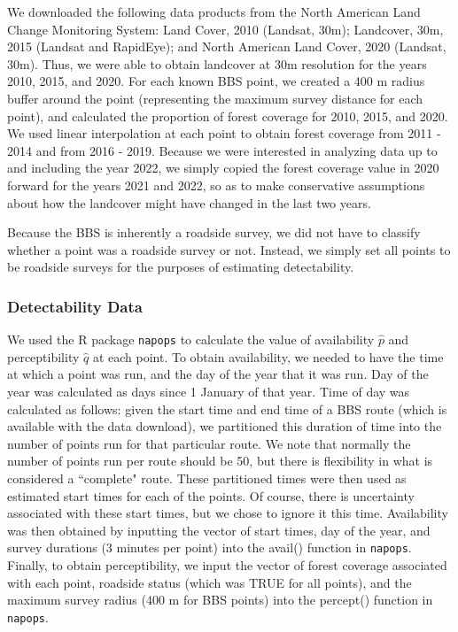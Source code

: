 \par We downloaded the following data products from the North American Land Change Monitoring System: Land Cover, 2010 (Landsat, 30m); Landcover, 30m, 2015 (Landsat and RapidEye); and North American Land Cover, 2020 (Landsat, 30m).
Thus, we were able to obtain landcover at 30m resolution for the years 2010, 2015, and 2020. 
For each known BBS point, we created a 400 m radius buffer around the point (representing the maximum survey distance for each point), and calculated the proportion of forest coverage for 2010, 2015, and 2020. 
We used linear interpolation at each point to obtain forest coverage from 2011 - 2014 and from 2016 - 2019. 
Because we were interested in analyzing data up to and including the year 2022, we simply copied the forest coverage value in 2020 forward for the years 2021 and 2022, so as to make conservative assumptions about how the landcover might have changed in the last two years.

\par Because the BBS is inherently a roadside survey, we did not have to classify whether a point was a roadside survey or not.
Instead, we simply set all points to be roadside surveys for the purposes of estimating detectability.

\subsubsection{Detectability Data}

\par We used the R package \texttt{napops} \citep{edwards_napops_2024} to calculate the value of availability $\hat{p}$ and perceptibility $\hat{q}$ at each point.
To obtain availability, we needed to have the time at which a point was run, and the day of the year that it was run.
Day of the year was calculated as days since 1 January of that year.
Time of day was calculated as follows: given the start time and end time of a BBS route (which is available with the data download), we partitioned this duration of time into the number of points run for that particular route.
We note that normally the number of points run per route should be 50, but there is flexibility in what is considered a ``complete" route.
These partitioned times were then used as estimated start times for each of the points. 
Of course, there is uncertainty associated with these start times, but we chose to ignore it this time.
Availability was then obtained by inputting the vector of start times, day of the year, and survey durations (3 minutes per point) into the avail() function in \texttt{napops}.
Finally, to obtain perceptibility, we input the vector of forest coverage associated with each point, roadside status (which was TRUE for all points), and the maximum survey radius (400 m for BBS points) into the percept() function in \texttt{napops}.

